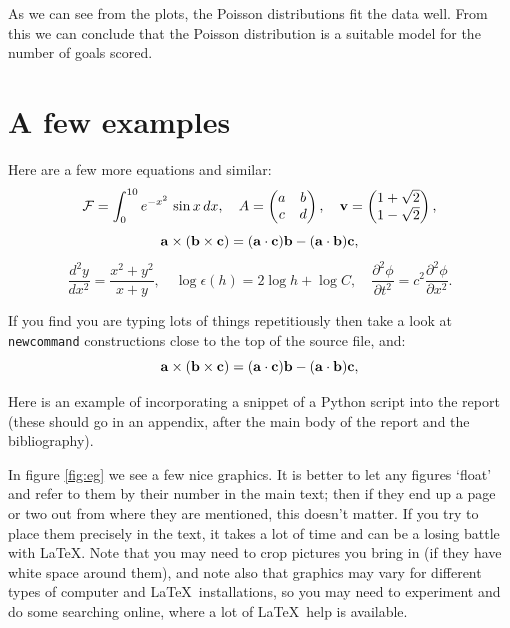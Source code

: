 \documentclass[12pt]{article}
\newcommand{\av}{{\bf a}}
\newcommand{\bv}{{\bf b}}
\newcommand{\cv}{{\bf c}}
\begin{document}
As we can see from the plots, the Poisson distributions fit the data well.
From this we can conclude that the Poisson distribution is a suitable model for the number of goals scored.

\section{A few examples} 
\label{sec:examples}

Here are a few more equations and similar:
%
\begin{equation}
\mathcal{F} = \int_0^{10} e^{-x^2}\, \sin x \, dx , \quad
A = \begin{pmatrix} a & b \\ c & d \end{pmatrix} , \quad
{\bf v} = \begin{pmatrix} 1+\sqrt{2} \\ 1- \sqrt{2} \end{pmatrix}, 
\end{equation}
%
\begin{equation}
{\bf a} \times ( {\bf b} \times {\bf c} ) = ({\bf a}\cdot{\bf c} ) {\bf b} -  ({\bf a}\cdot{\bf b} ) {\bf c}, 
\end{equation}
%
\begin{equation}\frac{d^2 y}{dx^2} = \frac{x^2 + y^2}{x+y} , \quad
\log \epsilon(h)  = 2 \log h + \log C, \quad
\frac{\partial^2 \phi}{\partial t^2} = c^2 \frac{\partial^2 \phi}{\partial x^2} .
\end{equation}
%

If you find you are typing lots of things repetitiously then take a look at {\tt newcommand} constructions close to the top of the source file, and:
%
\begin{equation}
\av \times ( \bv \times \cv ) = ( \av \cdot \cv ) \bv -  ( \av \cdot \bv ) \cv, 
\end{equation}
%

Here is an example of incorporating a snippet of a Python script into the report (these should go in an appendix, after the main body of the report and the bibliography). 
  
\vspace{3mm}



\vspace{3mm}

In figure \ref{fig:eg} we see a few nice graphics. It is better to let
any figures `float' and refer to them by their number in the main
text; then if they end up a page or two out from where they are
mentioned, this doesn't matter. If you try to place them precisely in
the text, it takes a lot of time and can be a losing battle with
\LaTeX. Note that you may need to crop pictures you bring in (if they
have white space around them), and note also that graphics may vary
for different types of computer and \LaTeX \, installations, so you
may need to experiment and do some searching online, where a lot of
\LaTeX \, help is available.
  
\end{document}
